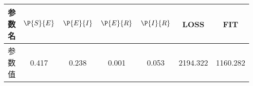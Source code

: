 \begin{tabular}{ccccccc}
\hline
参数名&$\P{S}{E}$&$\P{E}{I}$&$\P{E}{R}$&$\P{I}{R}$&LOSS&FIT\\
\hline
参数值&0.417&0.238&0.001&0.053&2194.322&1160.282\\
\hline
\end{tabular}